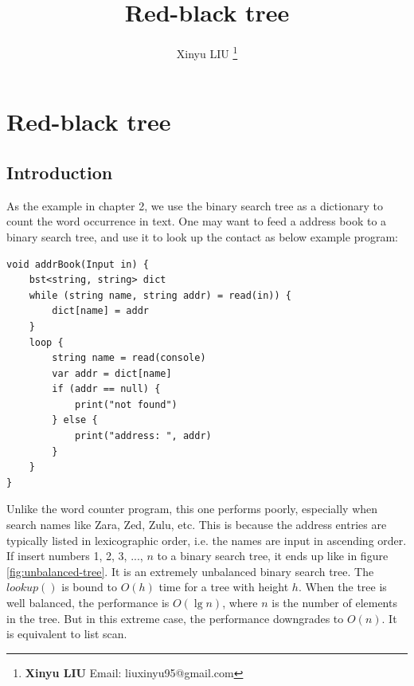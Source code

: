 \documentclass[b5paper]{article}
\begin{document}
\title{Red-black tree}

\author{Xinyu LIU
\thanks{{\bfseries Xinyu LIU} \newline
  Email: liuxinyu95@gmail.com \newline}
  }

\maketitle
\fi


\ifx\wholebook\relax
\chapter{Red-black tree}
\fi

\section{Introduction}
\label{sec:rbtree-introduction} 

As the example in chapter 2, we use the binary search tree as a dictionary to count the word occurrence in text. One may want to feed a address book to a binary search tree, and use it to look up the contact as below example program:

\lstset{frame = single}
\begin{lstlisting}[language=Bourbaki]
void addrBook(Input in) {
    bst<string, string> dict
    while (string name, string addr) = read(in)) {
        dict[name] = addr
    }
    loop {
        string name = read(console)
        var addr = dict[name]
        if (addr == null) {
            print("not found")
        } else {
            print("address: ", addr)
        }
    }
}
\end{lstlisting}

Unlike the word counter program, this one performs poorly, especially when search names like Zara, Zed, Zulu, etc. This is because the address entries are typically listed in lexicographic order, i.e. the names are input in ascending order. If insert numbers 1, 2, 3, ..., $n$ to a binary search tree, it ends up like in figure \ref{fig:unbalanced-tree}. It is an extremely unbalanced binary search tree. The $lookup()$ is bound to $O(h)$ time for a tree with height $h$. When the tree is well balanced, the performance is $O(\lg n)$, where $n$ is the number of elements in the tree. But in this extreme case, the performance downgrades to $O(n)$. It is equivalent to list scan.
\end{document}
